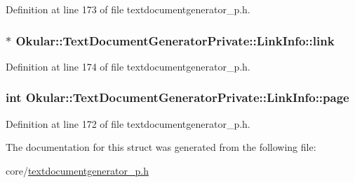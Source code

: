 Definition at line 173 of file textdocumentgenerator\+\_\+p.\+h.

\hypertarget{structOkular_1_1TextDocumentGeneratorPrivate_1_1LinkInfo_a1b29014996bb28edc4c5cbb4ebc45d7f}{
\subsubsection[{link}]{$\ast$ Okular\+::\+Text\+Document\+Generator\+Private\+::\+Link\+Info\+::link}}\label{structOkular_1_1TextDocumentGeneratorPrivate_1_1LinkInfo_a1b29014996bb28edc4c5cbb4ebc45d7f}


Definition at line 174 of file textdocumentgenerator\+\_\+p.\+h.

\hypertarget{structOkular_1_1TextDocumentGeneratorPrivate_1_1LinkInfo_aa123a5ca9189d3638522328da29e80b4}{
\subsubsection[{page}]{\setlength{\rightskip}{0pt plus 5cm}int Okular\+::\+Text\+Document\+Generator\+Private\+::\+Link\+Info\+::page}}\label{structOkular_1_1TextDocumentGeneratorPrivate_1_1LinkInfo_aa123a5ca9189d3638522328da29e80b4}


Definition at line 172 of file textdocumentgenerator\+\_\+p.\+h.



The documentation for this struct was generated from the following file\+:\begin{DoxyCompactItemize}
\item 
core/\hyperlink{textdocumentgenerator__p_8h}{textdocumentgenerator\+\_\+p.\+h}\end{DoxyCompactItemize}
